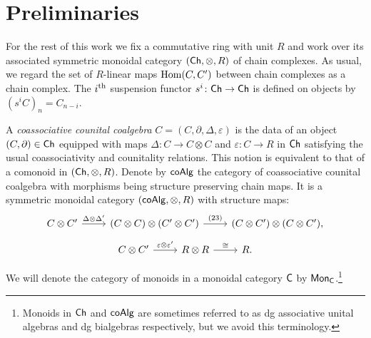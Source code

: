 
\section{Preliminaries}

For the rest of this work we fix a commutative ring with unit $R$ and work over its associated symmetric monoidal category $(\mathsf{Ch}, \otimes, R)$ of chain complexes.
As usual, we regard the set of $R$-linear maps $\mathrm{Hom}(C, C^\prime)$ between chain complexes as a chain complex.
The $i^\mathrm{th}$ suspension functor $s^i \colon \mathsf{Ch} \to \mathsf{Ch}$ is defined on objects by $(s^{i}C)_n= C_{n-i}$.

A \textit{coassociative counital coalgebra} $C = (C, \partial, \Delta, \varepsilon)$ is the data of an object $(C, \partial) \in \mathsf{Ch}$ equipped with maps $\Delta \colon C \to C \otimes C$ and $\varepsilon \colon C\to R$ in $\mathsf{Ch}$ satisfying the usual coassociativity and counitality relations. 
This notion is equivalent to that of a comonoid in $(\mathsf{Ch}, \otimes, R)$. Denote by $\mathsf{coAlg}$ the category of coassociative counital coalgebra with morphisms being structure preserving chain maps. 
It is a symmetric monoidal category $(\mathsf{coAlg}, \otimes, R)$ with structure maps:
\begin{equation} \label{e:coalgebras are symmetric monoidal1}
\begin{tikzcd}
C \otimes C^\prime \arrow[r, "\Delta \otimes \Delta^\prime"] &
(C \otimes C) \otimes (C^\prime \otimes C^\prime) \arrow[r, "(23)"] &
(C \otimes C^\prime) \otimes (C \otimes C^\prime),
\end{tikzcd}
\end{equation}
\begin{equation} \label{e:coalgebras are symmetric monoidal2}
\begin{tikzcd}
C \otimes C^\prime \arrow[r, "\varepsilon \otimes \varepsilon^\prime"] &
R \otimes R \arrow[r, "\cong"] & R.
\end{tikzcd}
\end{equation}

We will denote the category of monoids in a monoidal category $\mathsf{C}$ by $\mathsf{Mon}_{\mathsf{C}}$.\footnote{Monoids in $\mathsf{Ch}$ and $\mathsf{coAlg}$ are sometimes referred to as dg associative unital algebras and dg bialgebras respectively, but we avoid this terminology.}




